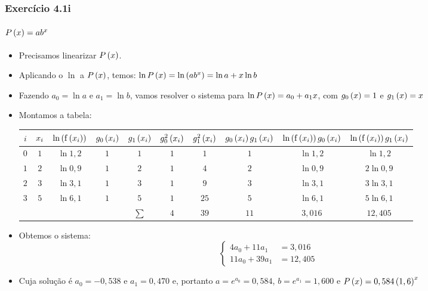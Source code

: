 \begin{frame}
\frametitle{Exercício 4.1i}
\framesubtitle{$P\left(x\right) = a b^x$}
\scriptsize
\begin{itemize}[<+->]
  \item Precisamos linearizar $P \left(x \right)$.
  \item Aplicando o $\ln$ a $P \left(x \right)$, temos: $\operatorname{\mathrm{ln}} P\left(x\right) = \operatorname{\mathrm{ln}} \left(a b ^ x\right) = \operatorname{\mathrm{ln}} a + x \operatorname{\mathrm{ln}} b$
  \item Fazendo $a_0 = \ln a$ e $a_1 = \ln b$, vamos resolver o sistema para $\operatorname{\mathrm{ln}} P \left(x\right) = a_0 + a_1 x$, com $g_0\left(x\right) = 1$ e $g_1 \left(x\right) = x$
  \item Montamos a tabela:
\begin{tabular}{c|c|c|c|c|c|c|c|c|c}
$i$ & 
  $x_i$ & 
  $\operatorname{\mathrm{ln}} \left( \mathrm{f} \left(x_i\right) \right)$ &
  $g_0 \left(x_i\right)$ &
  $g_1 \left(x_i\right)$ &
  $g_0^2 \left(x_i\right)$ &
  $g_1^2 \left(x_i\right)$ &
  $g_0 \left(x_i\right) g_1 \left(x_i\right)$ &
  $\operatorname{\mathrm{ln}} \left(\mathrm{f} \left(x_i\right) \right) g_0 \left(x_i\right)$ &
  $\operatorname{\mathrm{ln}} \left(\mathrm{f} \left(x_i\right) \right) g_1 \left(x_i\right)$\\
\hline
$0$ & $1$ & $\ln 1,2$ & $1$ & $1$ & $1$ & $1$  & $1$ & $\ln 1,2$ & $\ln 1,2$\\
\hline
$1$ & $2$ & $\ln 0,9$ & $1$ & $2$ & $1$ & $4$  & $2$ & $\ln 0,9$ & $2 \ln 0,9$\\
\hline
$2$ & $3$ & $\ln 3,1$ & $1$ & $3$ & $1$ & $9$  & $3$ & $\ln 3,1$ & $3 \ln 3,1$\\
\hline
$3$ & $5$ & $\ln 6,1$ & $1$ & $5$ & $1$ & $25$ & $5$ & $\ln 6,1$ & $5 \ln 6,1$\\
\hline
& & & & $\sum$ & $4$ & $39$ & $11$ & $3,016$ & $12,405$  
\end{tabular}
  \item Obtemos o sistema:
\[
\begin{cases}
4 a_0 + 11 a_1 &= 3,016\\
%
11 a_0 + 39 a_1 &= 12,405
\end{cases}
\]
  \item Cuja solução é $a_0 = -0,538$ e $a_1 = 0,470$ e, portanto $a = e^{a_0} = 0,584$, $b = e^{a_1} = 1,600$ e $P\left(x\right) = 0,584 \left(1,6\right)^x$
\end{itemize}

\end{frame}
